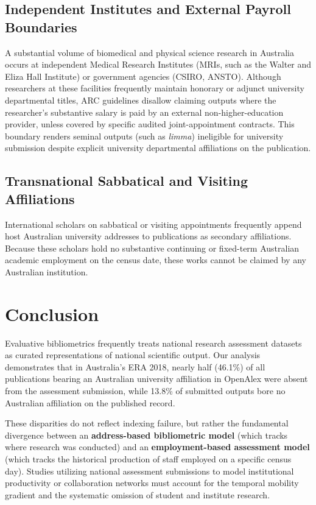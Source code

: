 \documentclass[11pt,a4paper]{article}
\begin{document}
\subsection{Independent Institutes and External Payroll Boundaries}
A substantial volume of biomedical and physical science research in Australia occurs at independent Medical Research Institutes (MRIs, such as the Walter and Eliza Hall Institute) or government agencies (CSIRO, ANSTO). Although researchers at these facilities frequently maintain honorary or adjunct university departmental titles, ARC guidelines disallow claiming outputs where the researcher's substantive salary is paid by an external non-higher-education provider, unless covered by specific audited joint-appointment contracts. This boundary renders seminal outputs (such as \textit{limma}) ineligible for university submission despite explicit university departmental affiliations on the publication.

\subsection{Transnational Sabbatical and Visiting Affiliations}
International scholars on sabbatical or visiting appointments frequently append host Australian university addresses to publications as secondary affiliations. Because these scholars hold no substantive continuing or fixed-term Australian academic employment on the census date, these works cannot be claimed by any Australian institution.

\section{Conclusion}

Evaluative bibliometrics frequently treats national research assessment datasets as curated representations of national scientific output. Our analysis demonstrates that in Australia's ERA 2018, nearly half (46.1\%) of all publications bearing an Australian university affiliation in OpenAlex were absent from the assessment submission, while 13.8\% of submitted outputs bore no Australian affiliation on the published record.

These disparities do not reflect indexing failure, but rather the fundamental divergence between an \textbf{address-based bibliometric model} (which tracks where research was conducted) and an \textbf{employment-based assessment model} (which tracks the historical production of staff employed on a specific census day). Studies utilizing national assessment submissions to model institutional productivity or collaboration networks must account for the temporal mobility gradient and the systematic omission of student and institute research.
\end{document}
